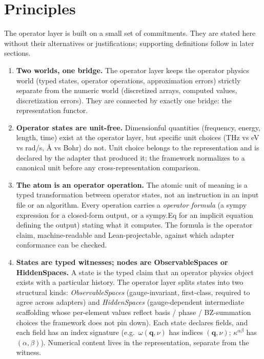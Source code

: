 \documentclass[11pt,a4paper]{article}
\begin{document}
\section{Principles}
\label{sec:principles}

The operator layer is built on a small set of commitments. They are stated here without
their alternatives or justifications; supporting definitions follow in later sections.

\begin{enumerate}[leftmargin=2.5em, itemsep=0.4em]
  \item \textbf{Two worlds, one bridge.} The operator layer keeps the operator physics world
        (typed states, operator operations, approximation errors) strictly separate from
        the numeric world (discretized arrays, computed values, discretization errors).
        They are connected by exactly one bridge: the representation functor.

  \item \textbf{Operator states are unit-free.} Dimensionful quantities (frequency,
        energy, length, time) exist at the operator layer, but specific unit choices
        (THz vs eV vs rad/s, \AA{} vs Bohr) do not. Unit choice belongs to the
        representation and is declared by the adapter that produced it; the framework
        normalizes to a canonical unit before any cross-representation comparison.

  \item \textbf{The atom is an operator operation.} The atomic unit of meaning is a typed
        transformation between operator states, not an instruction in an input file or an
        algorithm. Every operation carries a \emph{operator formula} (a sympy expression
        for a closed-form output, or a sympy.Eq for an implicit equation defining the output) stating
        what it computes. The formula is the operator claim, machine-readable and
        Lean-projectable, against which adapter conformance can be checked.

  \item \textbf{States are typed witnesses; nodes are ObservableSpaces or HiddenSpaces.}
        A state is the typed claim that an operator physics object exists with a
        particular history. The operator layer splits states into two structural kinds:
        \emph{ObservableSpaces} (gauge-invariant, first-class, required to agree across
        adapters) and \emph{HiddenSpaces} (gauge-dependent intermediate scaffolding
        whose per-element values reflect basis / phase / BZ-summation choices the
        framework does not pin down). Each state declares fields, and each field has an
        index signature (e.g.\ $\omega(\mathbf{q},\nu)$ has indices $(\mathbf{q}, \nu)$;
        $\kappa^{\alpha\beta}$ has $(\alpha, \beta)$). Numerical content lives in the
        representation, separate from the witness.


\end{enumerate}
\end{document}
